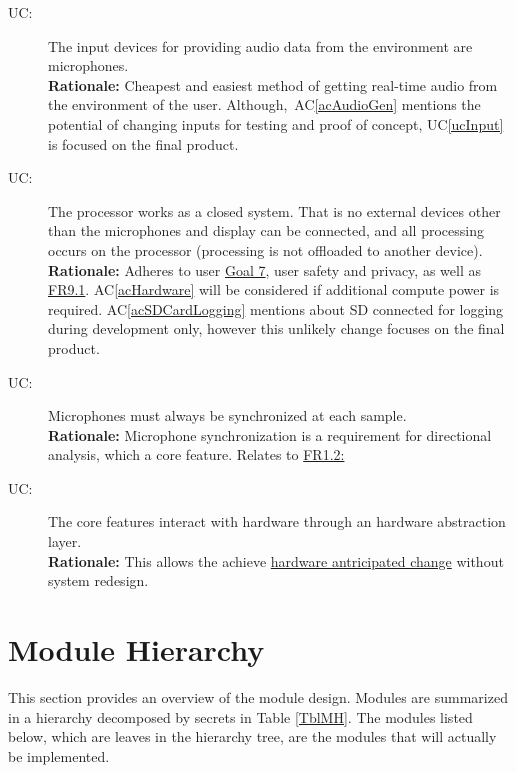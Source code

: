 \documentclass[12pt, titlepage]{article}
\newcommand{\acref}[1]{AC\ref{#1}}
\newcounter{ucnum}
\newcommand{\uctheucnum}{UC\theucnum}
\newcommand{\uref}[1]{UC\ref{#1}}
\begin{document}
\begin{description}
\item[ \uctheucnum \label{ucInput}:]
  The input devices for providing audio data from the environment are
  microphones. \\
 \textbf{Rationale:} Cheapest and easiest method of getting real-time audio from
 the environment of the user. Although,~\acref{acAudioGen} mentions the
 potential of changing inputs for testing and proof of concept, \uref{ucInput}
 is focused on the final product.

\item[ \uctheucnum \label{ucClosed}:]
  The processor works as a closed system. That is no external devices other than
  the microphones and display can be connected, and all processing occurs on the
  processor (processing is not offloaded to another device). \\
 \textbf{Rationale:} Adheres to user \hyperref[SRS-goal:user_safety]{Goal 7},
 user safety and privacy, as well as \hyperref[SRS-FR9_1]{FR9.1}.
 \acref{acHardware} will be considered if additional compute power is required.
 \acref{acSDCardLogging} mentions about SD connected for logging during
 development only, however this unlikely change focuses on the final product.

\item[ \uctheucnum \label{ucMicSych}:]
  Microphones must always be synchronized at each sample.\\
 \textbf{Rationale:} Microphone synchronization is a requirement for directional
 analysis, which a core feature. Relates to \hyperref[SRS-FR1_2]{FR1.2:}

\item[ \uctheucnum \label{ucHardwareAbstraction}:]
  The core features interact with hardware through an hardware abstraction
  layer.\\
 \textbf{Rationale:} This allows the achieve \hyperref[acHardware]{hardware
 antricipated change} without system redesign.

\end{description}

\section{Module Hierarchy} \label{SecMH}

This section provides an overview of the module design. Modules are summarized
in a hierarchy decomposed by secrets in Table \ref{TblMH}. The modules listed
below, which are leaves in the hierarchy tree, are the modules that will
actually be implemented.
\end{document}

